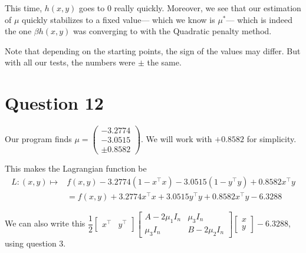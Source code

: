 \documentclass{article}
\newcommand{\tp}{^\top}
\begin{document}
This time, $h(x, y)$ goes to 0 really quickly. Moreover, we see that our estimation of $\mu$ quickly stabilizes to a fixed value--- which we know is $\mu^*$--- which is indeed the one $\beta h(x, y)$ was converging to with the Quadratic penalty method.

Note that depending on the starting points, the sign of the values may differ. But with all our tests, the numbers were $\pm$ the same.


\section*{Question 12}

Our program finds  
$\mu =
\begin{pmatrix}
-3.2774\\
-3.0515\\
\pm 0.8582
\end{pmatrix}$. We will work with $+ 0.8582$ for simplicity.

This makes the Lagrangian function be 
\begin{align*}
L : (x, y) \mapsto &f(x, y) - 3.2774 (1 - x\tp x) - 3.0515 (1 - y\tp y) + 0.8582 x\tp y\\
&= f(x, y) + 3.2774 x\tp x + 3.0515 y\tp y + 0.8582 x\tp y -6.3288
\end{align*}

We can also write this
$ \dfrac{1}{2}
\begin{bmatrix} x\tp & y\tp\end{bmatrix}
\begin{bmatrix} A-2\mu_1 I_n & \mu_3 I_n \\
\mu_3 I_n & B-2\mu_2 I_n \end{bmatrix}
\begin{bmatrix} x \\ y \end{bmatrix}
- 6.3288 $, using question 3.
\end{document}
